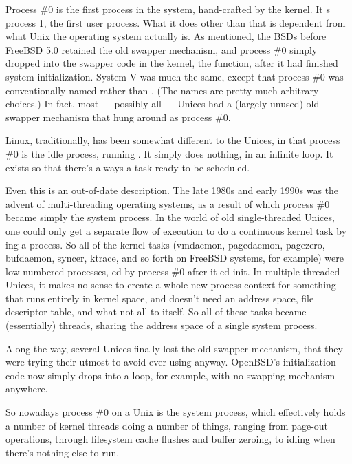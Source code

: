 \begin{description}
  Process \#0 is the first process in the system, hand-crafted by the kernel. It
  s process 1, the first user process. What it does other than that is
  dependent from what Unix the operating system actually is. As mentioned, the BSDs before
  FreeBSD 5.0 retained the old swapper mechanism, and process \#0 simply dropped into the
  swapper code in the kernel, the  function, after it had finished
  system initialization. System V was much the same, except that process \#0 was
  conventionally named  rather than . (The names are pretty much
  arbitrary choices.) In fact, most --- possibly all --- Unices had a (largely unused) old
  swapper mechanism that hung around as process \#0.

  Linux, traditionally, has been somewhat different to the Unices, in that process \#0 is
  the idle process, running . It simply does nothing, in an infinite loop. It
  exists so that there's always a task ready to be scheduled.

  Even this is an out-of-date description. The late 1980s and early 1990s was the advent
  of multi-threading operating systems, as a result of which process \#0 became simply the
  system process. In the world of old single-threaded Unices, one could only get a
  separate flow of execution to do a continuous kernel task by ing a
  process. So all of the kernel tasks (vmdaemon, pagedaemon, pagezero, bufdaemon, syncer,
  ktrace, and so forth on FreeBSD systems, for example) were low-numbered processes,
  ed by process \#0 after it ed init. In multiple-threaded
  Unices, it makes no sense to create a whole new process context for something that runs
  entirely in kernel space, and doesn't need an address space, file descriptor table, and
  what not all to itself. So all of these tasks became (essentially) threads, sharing the
  address space of a single system process.

  Along the way, several Unices finally lost the old swapper mechanism, that they were
  trying their utmost to avoid ever using anyway. OpenBSD's initialization code now simply
  drops into a  loop, for example, with no swapping mechanism
  anywhere.

  So nowadays process \#0 on a Unix is the system process, which effectively holds a number
  of kernel threads doing a number of things, ranging from page-out operations, through
  filesystem cache flushes and buffer zeroing, to idling when there's nothing else to run.
\end{description}

